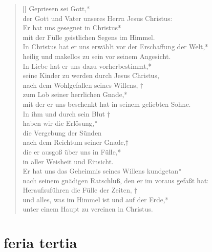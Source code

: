 \begin{verse}[\versewidth]
Gepriesen sei Gott,*\\
der Gott und Vater unseres Herrn Jesus Christus:\\
\vin Er hat uns gesegnet in Christus*\\
\vin mit der Fülle geistlichen Segens im Himmel.\\
In Christus hat er uns erwählt vor der Erschaffung der Welt,*\\
heilig und makellos zu sein vor seinem Angesicht.\\
\vin In Liebe hat er uns dazu vorherbestimmt,*\\
\vin seine Kinder zu werden durch Jesus Christus,\\
nach dem Wohlgefallen seines Willens, †\\
zum Lob seiner herrlichen Gnade,*\\
mit der er uns beschenkt hat in seinem geliebten Sohne.\\
\vin In ihm und durch sein Blut †\\
\vin haben wir die Erlösung,*\\
\vin die Vergebung der Sünden\\
nach dem Reichtum seiner Gnade,†\\
die er ausgoß über uns in Fülle,*\\
in aller Weisheit und Einsicht.\\
\vin Er hat uns das Geheimnis seines Willens kundgetan*\\
\vin nach seinem gnädigen Ratschluß, den er im voraus gefaßt hat:\\
Heraufzuführen die Fülle der Zeiten, †\\
und alles, was im Himmel ist und auf der Erde,*\\
unter einem Haupt zu vereinen in Christus.\\



\end{verse}


\section{feria tertia}

